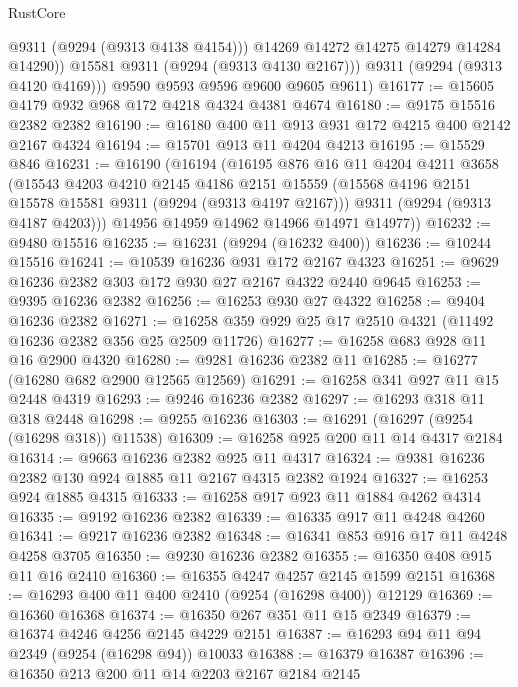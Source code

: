 \begin{lexlean}{RustCore}
\begin{coremodule}
                @9311
                (@9294 (@9313 @4138 @4154)))
              @14269
              @14272
              @14275
              @14279
              @14284
              @14290))
          @15581
          @9311
          (@9294 (@9313 @4130 @2167)))
        @9311
        (@9294 (@9313 @4120 @4169)))
      @9590
      @9593
      @9596
      @9600
      @9605
      @9611)
@16177 := @15605 @4179 @932 @968 @172 @4218 @4324 @4381 @4674
@16180 := @9175 @15516 @2382 @2382
@16190 := @16180 @400 @11 @913 @931 @172 @4215 @400 @2142 @2167 @4324
@16194 := @15701 @913 @11 @4204 @4213
@16195 := @15529 @846
@16231 := @16190
    (@16194
      (@16195
        @876
        @16
        @11
        @4204
        @4211
        @3658
        (@15543
          @4203
          @4210
          @2145
          @4186
          @2151
          @15559
          (@15568 @4196 @2151 @15578 @15581 @9311 (@9294 (@9313 @4197 @2167)))
          @9311
          (@9294 (@9313 @4187 @4203)))
        @14956
        @14959
        @14962
        @14966
        @14971
        @14977))
@16232 := @9480 @15516
@16235 := @16231 (@9294 (@16232 @400))
@16236 := @10244 @15516
@16241 := @10539 @16236 @931 @172 @2167 @4323
@16251 := @9629 @16236 @2382 @303 @172 @930 @27 @2167 @4322 @2440 @9645
@16253 := @9395 @16236 @2382
@16256 := @16253 @930 @27 @4322
@16258 := @9404 @16236 @2382
@16271 := @16258 @359 @929 @25 @17 @2510 @4321 (@11492 @16236 @2382 @356 @25 @2509 @11726)
@16277 := @16258 @683 @928 @11 @16 @2900 @4320
@16280 := @9281 @16236 @2382 @11
@16285 := @16277 (@16280 @682 @2900 @12565 @12569)
@16291 := @16258 @341 @927 @11 @15 @2448 @4319
@16293 := @9246 @16236 @2382
@16297 := @16293 @318 @11 @318 @2448
@16298 := @9255 @16236
@16303 := @16291 (@16297 (@9254 (@16298 @318)) @11538)
@16309 := @16258 @925 @200 @11 @14 @4317 @2184
@16314 := @9663 @16236 @2382 @925 @11 @4317
@16324 := @9381 @16236 @2382 @130 @924 @1885 @11 @2167 @4315 @2382 @1924
@16327 := @16253 @924 @1885 @4315
@16333 := @16258 @917 @923 @11 @1884 @4262 @4314
@16335 := @9192 @16236 @2382
@16339 := @16335 @917 @11 @4248 @4260
@16341 := @9217 @16236 @2382
@16348 := @16341 @853 @916 @17 @11 @4248 @4258 @3705
@16350 := @9230 @16236 @2382
@16355 := @16350 @408 @915 @11 @16 @2410
@16360 := @16355 @4247 @4257 @2145 @1599 @2151
@16368 := @16293 @400 @11 @400 @2410 (@9254 (@16298 @400)) @12129
@16369 := @16360 @16368
@16374 := @16350 @267 @351 @11 @15 @2349
@16379 := @16374 @4246 @4256 @2145 @4229 @2151
@16387 := @16293 @94 @11 @94 @2349 (@9254 (@16298 @94)) @10033
@16388 := @16379 @16387
@16396 := @16350 @213 @200 @11 @14 @2203 @2167 @2184 @2145

\end{coremodule}
\end{lexlean}
